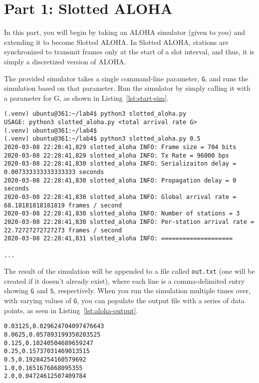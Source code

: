 \documentclass[11pt]{article}
\begin{document}
\section{Part 1: Slotted ALOHA}
\label{sec:sotted-aloha}
In this part, you will begin by taking an ALOHA simulator (given to you) and extending it to become Slotted ALOHA.
In Slotted ALOHA, stations are synchronized to transmit frames only at the start of a slot interval, and thus, it is simply a discretized version of ALOHA.

The provided simulator takes a single command-line parameter, \texttt{G}, and runs the simulation based on that parameter.
Run the simulator by simply calling it with a parameter for G, as shown in Listing~\ref{lst:start-sim}.

\begin{lstlisting}[style=ece361shell, caption={Running the Slotted ALOHA simulator (default behaviour is ALOHA)}, label={lst:start-sim}]
(.venv) ubuntu@361:~/lab4$ python3 slotted_aloha.py
USAGE: python3 slotted_aloha.py <total arrival rate G>
(.venv) ubuntu@361:~/lab4$
(.venv) ubuntu@361:~/lab4$ python3 slotted_aloha.py 0.5
2020-03-08 22:28:41,829 slotted_aloha INFO: Frame size = 704 bits
2020-03-08 22:28:41,829 slotted_aloha INFO: Tx Rate = 96000 bps
2020-03-08 22:28:41,830 slotted_aloha INFO: Serializaiton delay = 0.007333333333333333 seconds
2020-03-08 22:28:41,830 slotted_aloha INFO: Propagation delay = 0 seconds
2020-03-08 22:28:41,830 slotted_aloha INFO: Global arrival rate = 68.18181818181819 frames / second
2020-03-08 22:28:41,830 slotted_aloha INFO: Number of stations = 3
2020-03-08 22:28:41,830 slotted_aloha INFO: Per-station arrival rate = 22.72727272727273 frames / second
2020-03-08 22:28:41,831 slotted_aloha INFO: ====================

...

\end{lstlisting}


The result of the simulation will be appended to a file called \texttt{out.txt} (one will be created if it doesn't already exist), where each line is a comma-delimited entry showing \texttt{G} and \texttt{S}, respectively.
When you run the simulation multiple times over, with varying values of \texttt{G}, you can populate the output file with a series of data points, as seen in Listing~\ref{lst:aloha-output}.

\begin{lstlisting}[style=ece361shell, caption={Sample data from \texttt{out.txt} for ALOHA}, label={lst:aloha-output}]
0.03125,0.029624704097476643
0.0625,0.057893199350203525
0.125,0.10240504689659247
0.25,0.15737031469013515
0.5,0.19284254160579692
1.0,0.1651676868095355
2.0,0.04724612507409784
\end{lstlisting}
\end{document}
